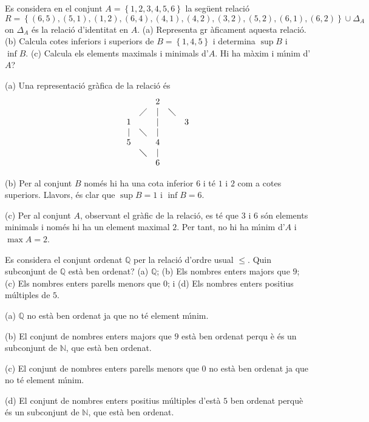 \begin{exer}
Es considera en el conjunt $A=\left\{ 1,2,3,4,5,6\right\} $ la seg\"{u}ent
relaci\'{o}
\begin{equation*}
R=\left\{
(6,5),(5,1),(1,2),(6,4),(4,1),(4,2),(3,2),(5,2),(6,1),(6,2)\right\} \cup
\Delta _{A}
\end{equation*}%
on $\Delta _{A}$ \'{e}s la relaci\'{o} d'identitat en $A$. (a) Representa gr%
\`{a}ficament aquesta relaci\'{o}. (b) Calcula cotes inferiors i superiors
de $B=\left\{ 1,4,5\right\} $ i determina $\sup B$ i $\inf B$. (c) Calcula
els elements maximals i minimals d'$A$. Hi ha m\`{a}xim i m\'{\i}nim d'$A$?
\end{exer}

\begin{solucio}
(a) Una representaci\'{o} gr\`{a}fica de la relaci\'{o} \'{e}s%
\begin{equation*}
\begin{array}{ccccc}
&  & 2 &  &  \\
& \diagup & | & \diagdown &  \\
1 &  & | &  & 3 \\
| & \diagdown & | &  &  \\
5 &  & 4 &  &  \\
& \diagdown & | &  &  \\
&  & 6 &  &
\end{array}%
\end{equation*}

(b) Per al conjunt $B$ nom\'{e}s hi ha una cota inferior $6$ i t\'{e} $1$ i $%
2$ com a cotes superiors. Llavors, \'{e}s clar que $\sup B=1$ i $\inf B=6$.

(c) Per al conjunt $A$, observant el gr\`{a}fic de la relaci\'{o}, es t\'{e}
que $3$ i $6$ s\'{o}n elements minimals i nom\'{e}s hi ha un element maximal
$2$. Per tant, no hi ha m\'{\i}nim d'$A$ i $\max A=2$.
\end{solucio}

\begin{exer}
Es considera el conjunt ordenat $\mathbb{Q}$ per la relaci\'{o} d'ordre
usual $\leq $. Quin subconjunt de $\mathbb{Q}$ est\`{a} ben ordenat? (a) $%
\mathbb{Q}$; (b) Els nombres enters majors que $9$; (c) Els nombres enters
parells menors que $0$; i (d) Els nombres enters positius m\'{u}ltiples de $%
5 $.
\end{exer}

\begin{solucio}
(a) $\mathbb{Q}$ no est\`{a} ben ordenat ja que no t\'{e} element m\'{\i}nim.

(b) El conjunt de nombres enters majors que $9$ est\`{a} ben ordenat perqu%
\`{e} \'{e}s un subconjunt de $\mathbb{N}$, que est\`{a} ben ordenat.

(c) El conjunt de nombres enters parells menors que $0$ no est\`{a} ben
ordenat ja que no t\'{e} element m\'{\i}nim.

(d) El conjunt de nombres enters positius m\'{u}ltiples d'est\`{a} $5$ ben
ordenat perqu\`{e} \'{e}s un subconjunt de $\mathbb{N}$, que est\`{a} ben
ordenat.
\end{solucio}


